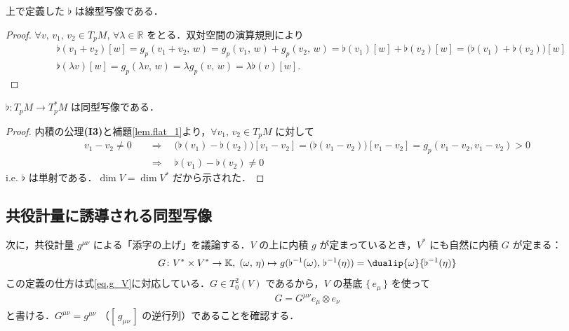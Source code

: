 \documentclass[geometry_main]{subfiles}
\begin{document}
\begin{mylem}[label=lem.flat_1]{}
	上で定義した $\flat$ は線型写像である．
\end{mylem}
\begin{proof} 
	$\forall v,\, v_1,\, v_2 \in T_pM,\, \forall \lambda \in \mathbb{R}$ をとる．双対空間の演算規則により
	\begin{align} 
		&\flat(v_1 + v_2)[w] = g_p(v_1 + v_2,\, w) = g_p(v_1,\, w) + g_p(v_2,\, w) = \flat(v_1)[w] + \flat(v_2)[w] = \bigl( \flat(v_1) + \flat(v_2)\bigr)[w] \\
		&\flat(\lambda v)[w] = g_p(\lambda v,\, w) = \lambda g_p(v,\, w) = \lambda \flat(v)[w].
	\end{align}
\end{proof}

\begin{mylem}[]{}
	$\flat \colon T_p M \to T^*_pM$ は同型写像である．
\end{mylem}
\begin{proof} 
	内積の公理\textbf{(I3)}と補題\ref{lem.flat_1}より，$\forall v_1,\, v_2 \in T_pM $ に対して
	\begin{align} 
		v_1 - v_2 \neq 0 \quad &\Longrightarrow \quad \bigl(\flat(v_1) - \flat(v_2)\bigr)[v_1 - v_2] = \bigl(\flat(v_1 - v_2)\bigr)[v_1 - v_2] = g_p(v_1 - v_2, v_1 - v_2) > 0 \\ 
		&\Longrightarrow \quad \flat(v_1) - \flat(v_2) \neq 0
	\end{align}
	i.e. $\flat$ は単射である．$\dim V = \dim V^*$ だから示された．
\end{proof}

\subsection{共役計量に誘導される同型写像}

次に，共役計量 $g^{\mu\nu}$ による「添字の上げ」を議論する．$V$ の上に内積 $g$ が定まっているとき，$V^*$ にも自然に内積 $G$ が定まる：
\begin{align} 
	\label{eq.G_V*}
	G \colon V^* \times V^* \to \mathbb{K},\; (\omega,\, \eta) \mapsto g(\flat^{-1}(\omega),\, \flat^{-1}(\eta)) = \dualip{\omega}{\flat^{-1}(\eta)}
\end{align}
この定義の仕方は式\eqref{eq.g_V}に対応している．$G \in T^2_0(V)$ であるから，$V$ の基底 $\{\, e_\mu\, \}$ を使って
\begin{align} 
	G = G^{\mu\nu} e_\mu \otimes e_\nu
\end{align}
と書ける．$G^{\mu\nu} = g^{\mu\nu}$ （$[\, g_{\mu\nu}\, ]$ の逆行列）であることを確認する．
\end{document}
